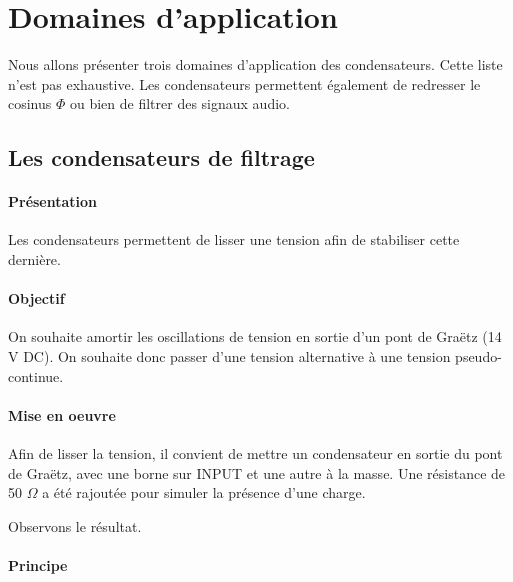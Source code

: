 
\chapter{Domaines d'application}


Nous allons présenter trois domaines d'application des condensateurs. Cette liste n'est pas exhaustive. Les condensateurs permettent également de redresser le cosinus $\Phi$ ou bien de filtrer des signaux audio.

\section{Les condensateurs de filtrage}

\subsubsection{Présentation}

Les condensateurs permettent de lisser une tension afin de stabiliser cette dernière.

\subsubsection{Objectif}

On souhaite amortir les oscillations de tension en sortie d'un pont de Graëtz (14 V DC).\n
On souhaite donc passer d'une tension alternative à une tension pseudo-continue.





\subsubsection{Mise en oeuvre}

Afin de lisser la tension, il convient de mettre un condensateur en sortie du pont de Graëtz, avec une borne sur INPUT et une autre à la masse. \n 
Une résistance de 50 $\Omega$ a été rajoutée pour simuler la présence d'une charge.


Observons le résultat.


\subsubsection{Principe}

